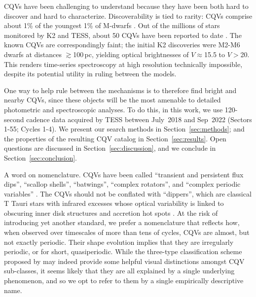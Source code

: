 \documentclass[11pt,twocolumn,tighten]{aastex63}
\begin{document}
CQVs have been challenging to understand because they have been both
hard to discover and hard to characterize.   Discoverability is tied
to rarity: CQVs comprise about 1\% of the youngest 1\% of M-dwarfs
\citep{2018AJ....155..196R}.  Out of the millions of stars monitored
by K2 and TESS, about 50 CQVs have been reported to date
\citep{2016AJ....152..114R,2017AJ....153..152S,2018AJ....155...63S,2019ApJ...876..127Z,2020AJ....160...86B,2022AJ....163..144G,2023ApJ...945..114P}.
The known CQVs are correspondingly faint; the initial K2 discoveries
\citep{2016AJ....152..114R,2017AJ....153..152S} were M2-M6 dwarfs at
distances $\gtrsim$100\,pc, yielding optical brightnesses of
$V$$\approx$15.5 to $V$$>$20.  This renders time-series spectroscopy
at high resolution technically impossible, despite its potential
utility in ruling between the models.

One way to help rule between the mechanisms is to therefore find
bright and nearby CQVs, since these objects will be the most amenable
to detailed photometric and spectroscopic analyses.  To do this, in
this work, we use 120-second cadence data acquired by TESS between
July~2018 and Sep~2022 (Sectors 1-55; Cycles 1-4).  We present our
search methods in Section~\ref{sec:methods}; and the properties of the
resulting CQV catalog in Section~\ref{sec:results}.  Open questions
are discussed in Section~\ref{sec:discussion}, and we conclude in
Section~\ref{sec:conclusion}.

A word on nomenclature.  CQVs have been called ``transient and
persistent flux dips'', ``scallop shells'', ``batwings'',
\citep{2017AJ....153..152S} ``complex rotators'',
\citep{2019ApJ...876..127Z,2022AJ....163..144G,2023ApJ...945..114P}
and ``complex periodic variables'' \citep{2023MNRAS.518.2921K}.  The
CQVs should not be conflated with ``dippers'', which are classical T
Tauri stars with infrared excesses whose optical variability is linked
to obscuring inner disk structures and accretion hot spots
\citep{2014AJ....147...82C,2021ApJ...908...16R}.  At the risk of
introducing yet another standard, we prefer a nomenclature that
reflects how, when observed over timescales of more than tens of
cycles, CQVs are almost, but not exactly periodic.  Their shape
evolution implies that they are irregularly periodic, or for short,
quasiperiodic.  While the three-type classification scheme proposed by
\citet{2017AJ....153..152S} may indeed provide some helpful visual
distinctions amongst CQV sub-classes, it seems likely that they are
all explained by a single underlying phenomenon, and so we opt to
refer to them by a single empirically descriptive name.
\end{document}
